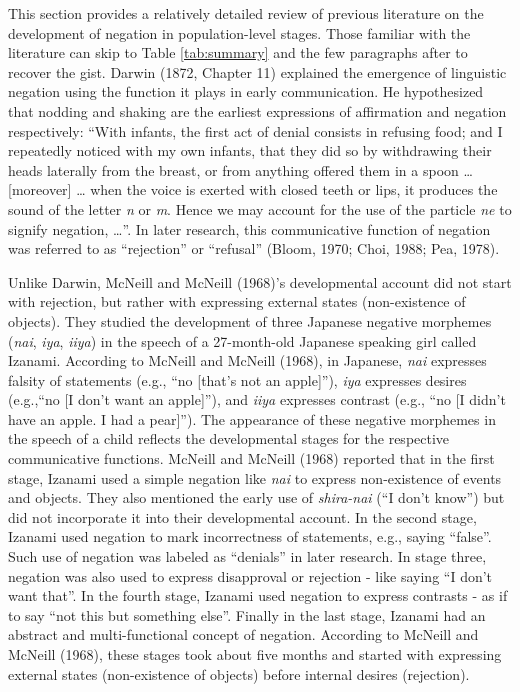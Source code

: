 \documentclass[
  man,floatsintext]{apa6}
\begin{document}
This section provides a relatively detailed review of previous literature on the development of negation in population-level stages. Those familiar with the literature can skip to Table \ref{tab:summary} and the few paragraphs after to recover the gist. Darwin (1872, Chapter 11) explained the emergence of linguistic negation using the function it plays in early communication. He hypothesized that nodding and shaking are the earliest expressions of affirmation and negation respectively: ``With infants, the first act of denial consists in refusing food; and I repeatedly noticed with my own infants, that they did so by withdrawing their heads laterally from the breast, or from anything offered them in a spoon \ldots{} {[}moreover{]} \ldots{} when the voice is exerted with closed teeth or lips, it produces the sound of the letter \emph{n} or \emph{m}. Hence we may account for the use of the particle \emph{ne} to signify negation, \ldots{}''. In later research, this communicative function of negation was referred to as ``rejection'' or ``refusal'' (Bloom, 1970; Choi, 1988; Pea, 1978).

Unlike Darwin, McNeill and McNeill (1968)'s developmental account did not start with rejection, but rather with expressing external states (non-existence of objects). They studied the development of three Japanese negative morphemes (\emph{nai}, \emph{iya}, \emph{iiya}) in the speech of a 27-month-old Japanese speaking girl called Izanami. According to McNeill and McNeill (1968), in Japanese, \emph{nai} expresses falsity of statements (e.g., ``no {[}that's not an apple{]}''), \emph{iya} expresses desires (e.g.,``no {[}I don't want an apple{]}''), and \emph{iiya} expresses contrast (e.g., ``no {[}I didn't have an apple. I had a pear{]}''). The appearance of these negative morphemes in the speech of a child reflects the developmental stages for the respective communicative functions. McNeill and McNeill (1968) reported that in the first stage, Izanami used a simple negation like \emph{nai} to express non-existence of events and objects. They also mentioned the early use of \emph{shira-nai} (``I don't know'') but did not incorporate it into their developmental account. In the second stage, Izanami used negation to mark incorrectness of statements, e.g., saying ``false''. Such use of negation was labeled as ``denials'' in later research. In stage three, negation was also used to express disapproval or rejection - like saying ``I don't want that''. In the fourth stage, Izanami used negation to express contrasts - as if to say ``not this but something else''. Finally in the last stage, Izanami had an abstract and multi-functional concept of negation. According to McNeill and McNeill (1968), these stages took about five months and started with expressing external states (non-existence of objects) before internal desires (rejection).
\end{document}
